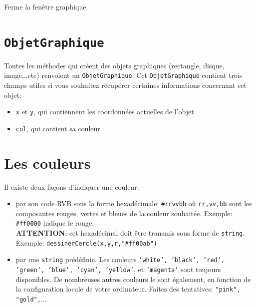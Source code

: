 \documentclass[11pt,a4paper]{article}
\begin{document}
\subsubsection*{}
Ferme la fenêtre graphique.

\section{{\tt ObjetGraphique}}
Toutes les méthodes qui créent des objets graphiques (rectangle, disque, image...etc) renvoient un {\tt ObjetGraphique}. Cet {\tt ObjetGraphique} contient trois champs utiles si vous souhaitez récupérer certaines informations concernant cet objet:
\begin{itemize}
  \item {\tt x} et {\tt y}, qui contiennent les coordonnées actuelles de l'objet
  \item {\tt col}, qui contient sa couleur
\end{itemize}

\section{Les couleurs}
Il existe deux façons d'indiquer une couleur:
\begin{itemize}
  \item par son code RVB sous la forme hexadécimale: {\tt \#rrvvbb} où {\tt rr,vv,bb} sont les composantes rouges, vertes et bleues de la couleur souhaitée. Exemple: {\tt \#ff0000} indique le rouge.\\ 
  {\bf ATTENTION}: cet hexadécimal doit être transmis sous forme de {\tt string}.\\
  Exemple: {\tt dessinerCercle(x,y,r,"#ff00ab")}
  \item par une {\tt string} prédéfinie. Les couleurs {\tt 'white', 'black', 'red', 'green', 'blue', 'cyan', 'yellow'}, et {\tt 'magenta'} sont toujours disponibles. De nombreuses autres couleurs le sont également, en fonction de la configuration locale de votre ordinateur. Faites des tentatives: {\tt "pink", "gold",}...
\end{itemize}
\end{document}
